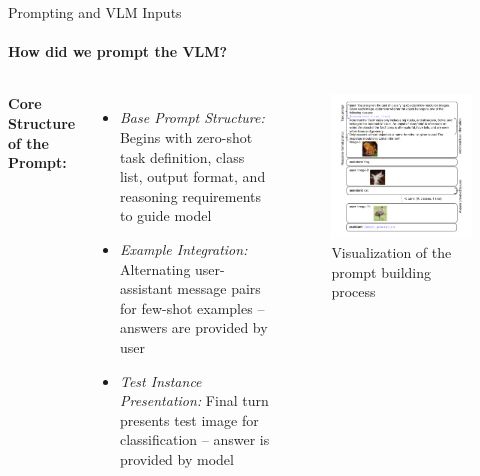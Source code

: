 \begin{frame}{Prompting and VLM Inputs}
\framesubtitle{How did we prompt the VLM?}
  \vspace{-1em}
  \begin{columns}[T]
    \column{\customcolumnwidth}
    \textbf{Core Structure of the Prompt:}
    \begin{itemize}
      \item \emph{Base Prompt Structure:} Begins with zero-shot task definition, class list, output format, and reasoning requirements to guide model
      \item \emph{Example Integration:} Alternating user-assistant message pairs for few-shot examples -- answers are provided by user
      \item \emph{Test Instance Presentation:} Final turn presents test image for classification -- answer is provided by model
    \end{itemize}
    \column{\customcolumnwidth}
    \vspace{-4em}
    \begin{figure}
      \centering
      \includegraphics[width=1.12\linewidth]{figures/prompt_building.pdf}
      \vspace{-2.4em}
      \caption{Visualization of the prompt building process}
    \end{figure}
  \end{columns}
\end{frame}
